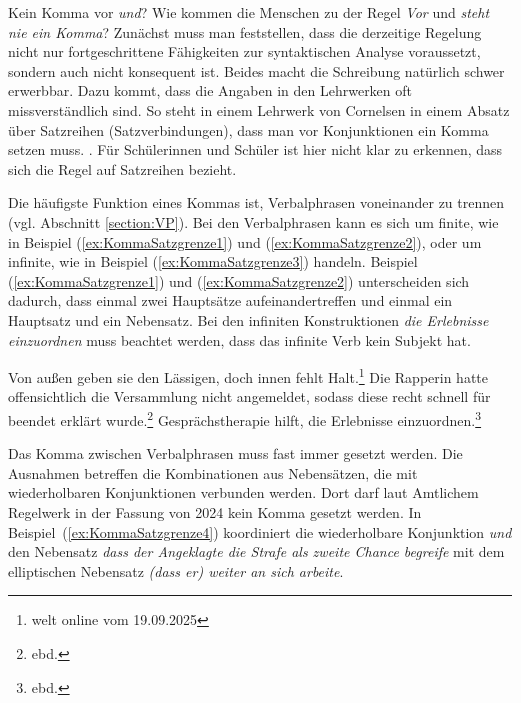 \begin{Exkurs}{Kein Komma vor \textit{und}?}
Wie kommen die Menschen zu der Regel \textit{Vor} und \textit{steht nie ein Komma}? Zunächst muss man feststellen, dass die derzeitige Regelung nicht nur fortgeschrittene Fähigkeiten zur syntaktischen Analyse voraussetzt, sondern auch nicht konsequent ist. Beides macht die Schreibung natürlich schwer erwerbbar. Dazu kommt, dass die Angaben in den Lehrwerken oft missverständlich sind. So steht in einem Lehrwerk von Cornelsen in einem Absatz über Satzreihen (Satzverbindungen), dass man vor Konjunktionen ein Komma setzen muss.  \citep[70]{RobbenRusnok2011}. Für Schülerinnen und Schüler ist hier nicht klar zu erkennen, dass sich die Regel auf Satzreihen bezieht.

\end{Exkurs}





Die häufigste Funktion eines Kommas ist, Verbalphrasen voneinander zu trennen (vgl. Abschnitt \ref{section:VP}). Bei den Verbalphrasen kann es sich um finite, wie in Beispiel (\ref{ex:KommaSatzgrenze1}) und (\ref{ex:KommaSatzgrenze2}), oder um infinite, wie in Beispiel (\ref{ex:KommaSatzgrenze3}) handeln. Beispiel (\ref{ex:KommaSatzgrenze1}) und (\ref{ex:KommaSatzgrenze2}) unterscheiden sich dadurch, dass einmal zwei Hauptsätze aufeinandertreffen und einmal ein Hauptsatz und ein Nebensatz. Bei den infiniten Konstruktionen \textit{die Erlebnisse einzuordnen} muss beachtet werden, dass das infinite Verb kein Subjekt hat. 


\ea
\ea Von außen geben sie den Lässigen, doch innen fehlt Halt.\label{ex:KommaSatzgrenze1}\footnote{welt online vom 19.09.2025}
\ex Die Rapperin hatte offensichtlich die Versammlung nicht angemeldet, sodass diese recht schnell für beendet erklärt wurde.\footnote{ebd.} \label{ex:KommaSatzgrenze2}
\ex Gesprächstherapie hilft, die Erlebnisse einzuordnen.\footnote{ebd.} \label{ex:KommaSatzgrenze3}
\z
\z



Das Komma zwischen Verbalphrasen muss fast immer gesetzt werden. Die Ausnahmen betreffen die Kombinationen aus Nebensätzen, die mit wiederholbaren Konjunktionen verbunden werden. Dort darf laut Amtlichem Regelwerk in der Fassung von 2024 kein Komma gesetzt werden. In Beispiel~(\ref{ex:KommaSatzgrenze4}) koordiniert die wiederholbare Konjunktion \textit{und} den Nebensatz \textit{dass der Angeklagte die Strafe als zweite Chance begreife} mit dem elliptischen Nebensatz \textit{(dass er) weiter an sich arbeite}.

